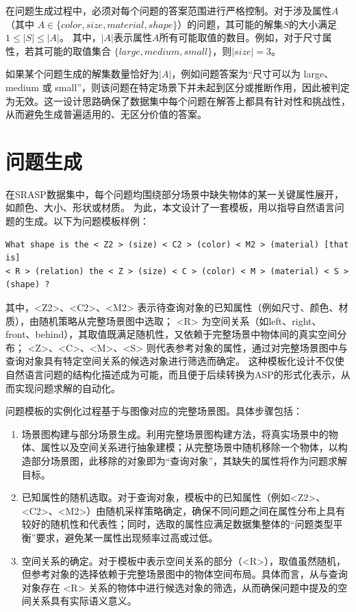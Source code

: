 在问题生成过程中，必须对每个问题的答案范围进行严格控制。对于涉及属性$A$（其中
$A \in \{ color, size, material, shape\}$）的问题，其可能的解集$S$的大小满足$1 \leq |S| \leq |A|$。
其中，$|A|$表示属性$A$所有可能取值的数目。例如，对于尺寸属性，若其可能的取值集合
$\{ large, medium, small\}$，则$|size| = 3$。

如果某个问题生成的解集数量恰好为$|A|$，例如问题答案为“尺寸可以为 large、medium 或 small”，则该问题在特定场景下并未起到区分或推断作用，因此被判定为无效。这一设计思路确保了数据集中每个问题在解答上都具有针对性和挑战性，从而避免生成普遍适用的、无区分价值的答案。
\section{问题生成}
在SRASP数据集中，每个问题均围绕部分场景中缺失物体的某一关键属性展开，如颜色、大小、形状或材质。
为此，本文设计了一套模板，用以指导自然语言问题的生成。以下为问题模板样例：
\begin{lstlisting}
What shape is the < Z2 > (size) < C2 > (color) < M2 > (material) [that is] 
< R > (relation) the < Z > (size) < C > (color) < M > (material) < S > (shape) ?
\end{lstlisting}
其中，<Z2>、<C2>、<M2> 表示待查询对象的已知属性（例如尺寸、颜色、材质），由随机策略从完整场景图中选取；
<R> 为空间关系（如left、right、front、behind），其取值既满足随机性，又依赖于完整场景中物体间的真实空间分布；
<Z>、<C>、<M>、<S> 则代表参考对象的属性，通过对完整场景图中与查询对象具有特定空间关系的候选对象进行筛选而确定。
这种模板化设计不仅使自然语言问题的结构化描述成为可能，而且便于后续转换为ASP的形式化表示，从而实现问题求解的自动化。

问题模板的实例化过程基于与图像对应的完整场景图。具体步骤包括：
\begin{enumerate}[itemsep=0pt,parsep=0pt]
\item 场景图构建与部分场景生成。利用完整场景图构建方法，将真实场景中的物体、属性以及空间关系进行抽象建模；从完整场景中随机移除一个物体，以构造部分场景图，此移除的对象即为“查询对象”，其缺失的属性将作为问题求解目标。
\item 已知属性的随机选取。对于查询对象，模板中的已知属性（例如<Z2>、<C2>、<M2>）由随机采样策略确定，确保不同问题之间在属性分布上具有较好的随机性和代表性；同时，选取的属性应满足数据集整体的“问题类型平衡”要求，避免某一属性出现频率过高或过低。
\item 空间关系的确定。对于模板中表示空间关系的部分（<R>），取值虽然随机，但参考对象的选择依赖于完整场景图中的物体空间布局。具体而言，从与查询对象存在 <R> 关系的物体中进行候选对象的筛选，从而确保问题中提及的空间关系具有实际语义意义。
\end{enumerate}

